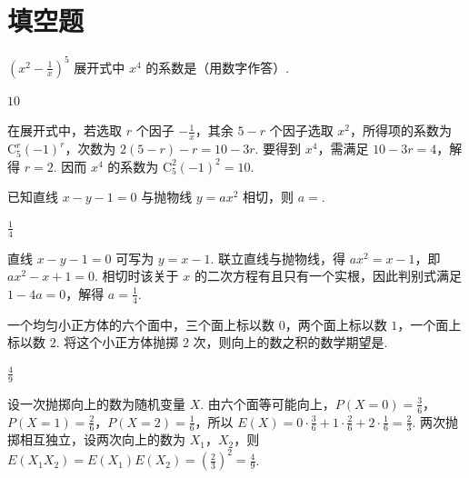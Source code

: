 \section{填空题}
\begin{problem}
\(\left(x^{2} - \frac{1}{x}\right)^{5}\) 展开式中 \(x^{4}\) 的系数是\fillinblank{}（用数字作答）.
\end{problem}

\begin{answer}
\(10\)
\end{answer}

\begin{solution}
在展开式中，若选取 \(r\) 个因子 \(-\frac{1}{x}\)，其余 \(5-r\) 个因子选取 \(x^2\)，所得项的系数为 \(\mathrm C_5^r(-1)^r\)，次数为 \(2(5-r)-r=10-3r\). 要得到 \(x^4\)，需满足 \(10-3r=4\)，解得 \(r=2\). 因而 \(x^4\) 的系数为 \(\mathrm C_5^2(-1)^2=10\).
\end{solution}

\begin{problem}
已知直线 \(x - y - 1 = 0\) 与抛物线 \(y = ax^2\) 相切，则 \(a = \)\fillinblank{}.
\end{problem}

\begin{answer}
\(\frac{1}{4}\)
\end{answer}

\begin{solution}
直线 \(x-y-1=0\) 可写为 \(y=x-1\). 联立直线与抛物线，得 \(ax^2=x-1\)，即 \(ax^2-x+1=0\). 相切时该关于 \(x\) 的二次方程有且只有一个实根，因此判别式满足 \(1-4a=0\)，解得 \(a=\frac{1}{4}\).
\end{solution}

\begin{problem}
一个均匀小正方体的六个面中，三个面上标以数 \(0\)，两个面上标以数 \(1\)，一个面上标以数 \(2\). 将这个小正方体抛掷 \(2\text{ 次}\)，则向上的数之积的数学期望是\fillinblank{}.
\end{problem}

\begin{answer}
\(\frac{4}{9}\)
\end{answer}

\begin{solution}
设一次抛掷向上的数为随机变量 \(X\). 由六个面等可能向上，\(P(X=0)=\frac{3}{6}\)，\(P(X=1)=\frac{2}{6}\)，\(P(X=2)=\frac{1}{6}\)，所以 \(E(X)=0\cdot\frac{3}{6}+1\cdot\frac{2}{6}+2\cdot\frac{1}{6}=\frac{2}{3}\). 两次抛掷相互独立，设两次向上的数为 \(X_1\)，\(X_2\)，则 \(E(X_1X_2)=E(X_1)E(X_2)=\left(\frac{2}{3}\right)^2=\frac{4}{9}\).
\end{solution}

